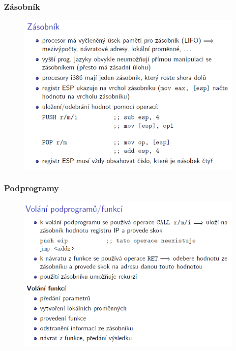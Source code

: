 \documentclass[10pt,a4paper]{article}
\begin{document}
\clearpage
\subsubsection{Zásobník}
\begin{figure} [h]
	\includegraphics[scale=0.65]{img/prvni_odstavec/otazka5/zasobnik.png}	
\end{figure}

\clearpage
\subsubsection{Podprogramy}
\begin{figure} [h]
	\includegraphics[scale=0.65]{img/prvni_odstavec/otazka5/podprogramy1.png}	
\end{figure}
\end{document}
